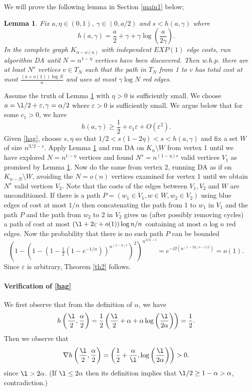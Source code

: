 \documentclass[12pt]{article}
\newcommand{\1}{\textbf{1}}
\def\a{\alpha} \def\b{\beta} \def\d{\delta} \def\D{\Delta}
\def\e{\varepsilon} \def\f{\phi} \def\F{{\Phi}} \def\vp{\varphi} \def\g{\gamma}
\newtheorem{lemma}[theorem]{Lemma}
\newcommand{\brac}[1]{\left(#1\right)}
\newcommand{\bfrac}[2]{\left(\frac{#1}{#2}\right)}
\def\sm{\setminus}
\newcommand{\beq}[2]{\begin{equation}\label{#1}#2\end{equation}}
\begin{document}
We will prove the following lemma in Section \ref{main1} below;
\begin{lemma}\label{mainshort}
Fix $a,\eta\in(0,1)$, $\gamma\in(0,a/2)$ and $s<h(a,\gamma)$ where
\[
h(a,\gamma)=\frac{a}{2}+\gamma+\gamma\log\!\left(\frac{a}{2\gamma}\right).
\]
In the complete graph $K_{n-o(n)}$ with independent $EXP(1)$  edge costs, run algorithm DA until $N=n^{1-\eta}$ vertices have been discovered. Then w.h.p. there are at least $N^s$ vertices $v\in T_N$ such that the path in $T_N$ from 1 to $v$ has total cost at most $\frac{\left(a+o(1)\right)\log N}{n}$ and uses at most $\gamma\log N$ red edges.
\end{lemma}
Assume the truth of Lemma \ref{mainshort} with $\eta>0$ is sufficiently small.  We choose $a=\l/2+\e,\g=\a/2$ where $\e>0$ is sufficiently small. We argue below that for some $c_1>0$, we have
\beq{hag}{
h(a,\g)\geq \frac12+c_1\e+O(\e^2).
}
Given \eqref{hag}, choose $s,\eta$ so that $1/2 < s(1-2\eta) <s< h(a, \g)$ and fix a set $W$ of size $n^{3/2-s}$. Apply Lemma \ref{mainshort} and run DA on $K_n\sm W$ from vertex 1 until we have explored $N=n^{1-\eta}$ vertices and found $N^s=n^{(1-\eta)s}$ valid vertices $V_1$ as promised by Lemma \ref{mainshort}. Now do the same from vertex 2, running DA as if on $K_{n-N}\sm W$, avoiding the $N=o(n)$ vertices examined for vertex 1 until we obtain $N^{s}$ valid vertices $V_2$. Note that the costs of the edges between $V_1,V_2$ and $W$ are unconditioned.  If there is a path $P=(w_1\in V_1,w\in W,w_2\in V_2)$ using blue edges of cost at most $1/n$ then concatenating the path from 1 to $w_1$ in $V_1$ and the path $P$ and the path from $w_2$ to 2 in $V_2$ gives us (after possibly removing cycles) a path of cost at most $(\l+2\e+o(1))\log n/n$ containing at most $\a\log n$ red edges. Now the probability that there is no such path $P$ can be bounded
\[
(1-(1-(1-\tfrac12(1-e^{-1/n}))^{n^{(1-\eta)s}})^2)^{n^{3/2-s}}=e^{-\Omega(n^{(1-2\eta)s-1/2})}=o(1).
\]
Since $\e$ is arbitrary, Theorem \ref{th2} follows.
\paragraph{Verification of \eqref{hag}}
We first observe that from the definition of $\a$, we have
\[
h\brac{\frac\l2,\frac\a2}=\frac12\brac{\frac{\l}2+\a+\a\log\bfrac{\l}{2\a}}=\frac12.
\]
Then we observe that
\beq{h+}{
\nabla h\brac{\frac\l2,\frac\a2}=\brac{\frac12+\frac\a\l,\log\bfrac\l{2\a}}>0.
}
since $\l>2\a$. (If $\l\leq 2\a$ then its definition implies that $\l/2\geq 1-\a>\a$, contradiction.)
\end{document}
